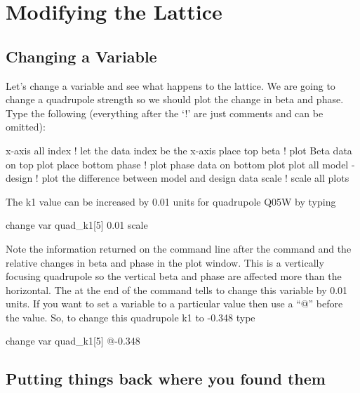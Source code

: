 \section{Modifying the Lattice}
\label{s:modify.lattice}

\subsection{Changing a Variable}
\label{ss:change_variable}

Let's change a variable and see what happens to the lattice. We are going to
change a quadrupole strength so we should plot the change in beta and phase.
Type the following (everything after the `!' are just comments and can be
omitted):
\begin{example}
  x-axis all index        ! let the data index be the x-axis
  place top beta          ! plot Beta data on top plot
  place bottom phase      ! plot phase data on bottom plot
  plot all model - design ! plot the difference between model and design data
  scale                   ! scale all plots
\end{example}

The k1 value can be increased by 0.01 units for quadrupole Q05W by typing
\begin{example}
  change var quad\_k1[5] 0.01
  scale
\end{example}
Note the information returned on the command line after the command
and the relative changes in beta and phase in the plot window. This is
a vertically focusing quadrupole so the vertical beta and phase are
affected more than the horizontal. The  at the end of the
command tells \tao to change this variable by 0.01 units. If you want
to set a variable to a particular value then use a ``@'' before the
value. So, to change this quadrupole k1 to -0.348 type
\begin{example}
  change var quad\_k1[5] @-0.348
\end{example}

\subsection{Putting things back where you found them}
\label{ss:put_it_back}

